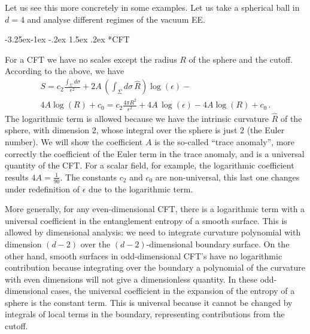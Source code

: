 \documentclass[11pt]{article}
\makeatletter
\renewcommand\subsubsection{\@startsection{subsubsection}{3}{\z@}%
                                   {-3.25ex\@plus -1ex \@minus -.2ex}%
                                     {1.5ex \@plus .2ex}%
                                     {\normalfont\itshape}}
\numberwithin{equation}{section}
\makeatother
\begin{document}
Let us see this more concretely in some examples. Let us take a spherical ball in $d=4$ and analyse different regimes of the vacuum EE.

\subsubsection*{CFT}

For a CFT we have no scales except the radius $R$ of the sphere and the cutoff.
According to the above, we have
\begin{multline}
S=c_2 \frac{\int_\Sigma d\sigma}{\epsilon^2}+ 2 A\, \left(\int_\Sigma d\sigma\, \hat{R}\right) \log(\epsilon) - \\
4 A\log(R) +c_0=c_2 \frac{4 \pi R^2}{\epsilon^2}+ 4 A \, \log(\epsilon) - 4 A\log(R) +c_0\,.
\end{multline}
The logarithmic term is allowed because we have the intrinsic curvature $\hat{R}$ of the sphere, with dimension $2$, whose integral over the sphere is just $2$ (the Euler number). We will show the coefficient $A$ is the so-called ``trace anomaly'', more correctly the coefficient of the Euler term in the trace anomaly, and is a universal quantity of the CFT.  For a scalar field, for example, the logarithmic coefficient results $4A=\frac{1}{90}$. The constants $c_2$ and $c_0$ are non-universal, this last one changes under redefinition of $\epsilon$ due to the logarithmic term.  

More generally, for any even-dimensional CFT, there is a logarithmic term with a universal coefficient in the entanglement entropy of a smooth surface. This is allowed by dimensional analysis: we need to integrate curvature polynomial with dimension $(d-2)$ over the $(d-2)$-dimensional boundary surface.  On the other hand, smooth surfaces in odd-dimensional CFT's have no logarithmic contribution because integrating over the boundary a polynomial of the curvature with even dimensions will not give a dimensionless quantity. In these odd-dimensional cases, the universal coefficient in the expansion of the entropy of a sphere is the constant term. This is universal because it cannot be changed by integrals of local terms in the boundary, representing contributions from the cutoff. 
\end{document}
